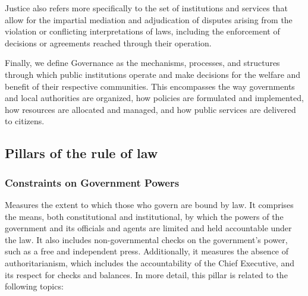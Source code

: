 \documentclass[
]{agujournal2019}
\begin{document}
Justice also refers more specifically to the set of institutions and
services that allow for the impartial mediation and adjudication of
disputes arising from the violation or conflicting interpretations of
laws, including the enforcement of decisions or agreements reached
through their operation.

Finally, we define Governance as the mechanisms, processes, and
structures through which public institutions operate and make decisions
for the welfare and benefit of their respective communities. This
encompasses the way governments and local authorities are organized, how
policies are formulated and implemented, how resources are allocated and
managed, and how public services are delivered to citizens.

\subsection{Pillars of the rule of
law}\label{pillars-of-the-rule-of-law}

\subsubsection{Constraints on Government
Powers}\label{constraints-on-government-powers}

Measures the extent to which those who govern are bound by law. It
comprises the means, both constitutional and institutional, by which the
powers of the government and its officials and agents are limited and
held accountable under the law. It also includes non-governmental checks
on the government's power, such as a free and independent press.
Additionally, it measures the absence of authoritarianism, which
includes the accountability of the Chief Executive, and its respect for
checks and balances. In more detail, this pillar is related to the
following topics:
\end{document}
